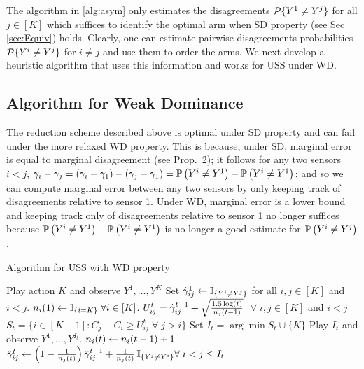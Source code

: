 The algorithm in \ref{alg:asym} only estimates the disagreements $\P\{Y^1 \neq Y^j\}$ for all $j \in [K]$ which suffices to identify the optimal arm when SD property (see Sec \ref{sec:Equiv}) holds. Clearly, one can estimate pairwise disagreements probabilities $\P\{Y^i \neq Y^j\}$ for $i\neq j$ and use them to order the arms. We next develop a heuristic algorithm that uses this information and works for USS under WD. 

\subsection{Algorithm for Weak Dominance}
The reduction scheme described above is optimal under SD property and can fail under the more relaxed WD property. This is because, under SD, marginal error is equal to marginal disagreement (see Prop.~2); it follows for any two sensors $i < j$, $\gamma_i-\gamma_j = (\gamma_i-\gamma_1) - (\gamma_j-\gamma_1) = \Prob{Y^i\ne Y^1} - \Prob{Y^i\ne Y^1}$; and so we can compute marginal error between any two sensors by only keeping track of disagreements relative to sensor 1. Under WD, marginal error is a lower bound and keeping track only of disagreements relative to sensor 1 no longer suffices because $\Prob{Y^i\ne Y^1} - \Prob{Y^i\ne Y^1}$ is no longer a good estimate for $\Prob{Y^i\ne Y^j}$.
\begin{center}
\begin{minipage}{0.48\textwidth}
		\begin{algorithm}[H]
			\caption{Algorithm for USS with WD property} %
			\label{alg:UCB}
			\begin{algorithmic}[1]
				\STATE Play action $K$ and observe $Y^1,\dots,Y^K$
				\STATE Set $\hgamma_{ij}^1 \set \one{Y^i\ne Y^j}$ for all $i,j\in [K]$ and $i < j$.
				\STATE $n_i(1)\leftarrow \one{i=K} \; \forall i\in [K]$.
				\STATE $U_{ij}^t=\hgamma_{ij}^{t-1} + \sqrt{\frac{1.5\log(t)}{n_j(t-1)}}$  $\;\forall \; i,j \in [K]$ and $i<j$ \label{algo:UCB}
				\STATE $S_t=\{i \in [K-1]: C_j-C_i \geq U_{ij}^t \;\forall \;   j > i \}$ \label{algo:sort}
				\STATE Set $I_t= \arg \min S_t \cup \{K\} $
				\STATE Play $I_t$ and observe $Y^1,\dots,Y^{I_t}$.
				\STATE $n_i(t) \set n_i(t-1)+1$\\
				 \STATE $\hgamma_{ij}^t \set \left (1-\frac{1}{n_j(t)}\right )
				 \hgamma_{ij}^{t-1} + \frac{1}{n_j(t)} \,\one{Y^j\ne Y^i} \forall \; i<j \leq I_t$ \label{algo:Update}
				\ENDFOR
				\ENDFOR
			\end{algorithmic}
		\end{algorithm}
	\end{minipage}
\end{center}

